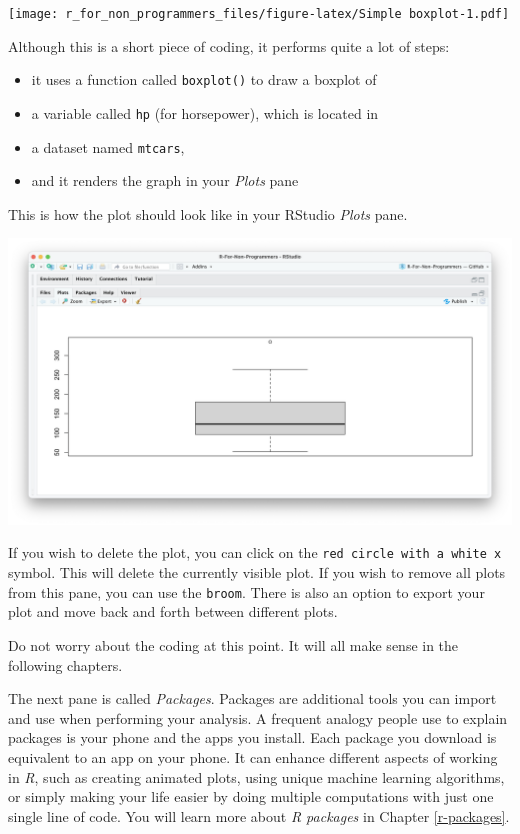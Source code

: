 \documentclass[
]{book}
\begin{document}
\texttt{[image: r\_for\_non\_programmers\_files/figure-latex/Simple boxplot-1.pdf]}

Although this is a short piece of coding, it performs quite a lot of steps:

\begin{itemize}
\item
  it uses a function called \texttt{boxplot()} to draw a boxplot of
\item
  a variable called \texttt{hp} (for horsepower), which is located in
\item
  a dataset named \texttt{mtcars},
\item
  and it renders the graph in your \emph{Plots} pane
\end{itemize}

This is how the plot should look like in your RStudio \emph{Plots} pane.

\includegraphics{images/chapter_04_img/05_files_plots_etc/02_rstudio_plots.png}

If you wish to delete the plot, you can click on the \texttt{red\ circle\ with\ a\ white\ x} symbol. This will delete the currently visible plot. If you wish to remove all plots from this pane, you can use the \texttt{broom}. There is also an option to export your plot and move back and forth between different plots.

Do not worry about the coding at this point. It will all make sense in the following chapters.

The next pane is called \emph{Packages}. Packages are additional tools you can import and use when performing your analysis. A frequent analogy people use to explain packages is your phone and the apps you install. Each package you download is equivalent to an app on your phone. It can enhance different aspects of working in \emph{R}, such as creating animated plots, using unique machine learning algorithms, or simply making your life easier by doing multiple computations with just one single line of code. You will learn more about \emph{R packages} in Chapter \ref{r-packages}.
\end{document}
